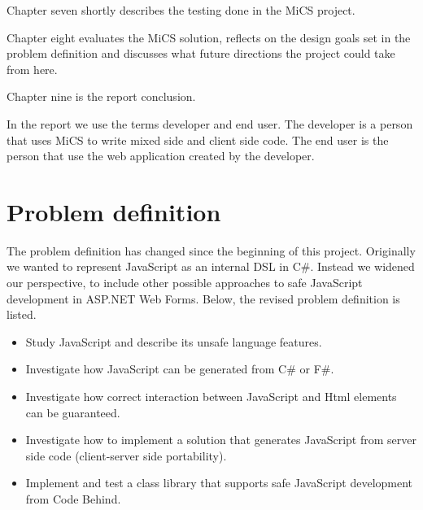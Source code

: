 	Chapter seven shortly describes the testing done in the MiCS project.
	
	Chapter eight evaluates the MiCS solution, reflects on the design goals set in the problem definition and discusses what future directions the project could take from here.

	Chapter nine is the report conclusion.

	In the report we use the terms developer and end user. The developer is a person that uses MiCS to write mixed side and client side code. The end user is the person that use the web application created by the developer.


\section{Problem definition}
	The problem definition has changed since the beginning of this project. Originally we wanted to represent JavaScript as an internal DSL in C\#. Instead we widened our perspective, to include other possible approaches to safe JavaScript development in ASP.NET Web Forms. Below, the revised problem definition is listed.
	\begin{itemize}

	\item Study JavaScript and describe its unsafe language features.

	\item Investigate how JavaScript can be generated from C\# or F\#.
	\item Investigate how correct interaction between JavaScript and Html elements can be guaranteed.

	\item Investigate how to implement a solution that generates JavaScript from server side code (client-server side portability).

	\item Implement and test a class library that supports safe JavaScript development from Code Behind.


	\end{itemize}

